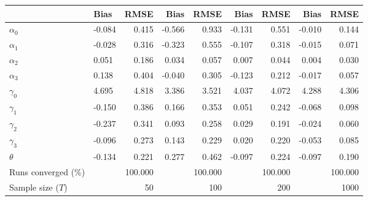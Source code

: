 
\begin{tabular}[t]{llrrrrrrr}
\toprule
  & Bias & RMSE & Bias & RMSE & Bias & RMSE & Bias & RMSE\\
\midrule
$\alpha_{0}$ & -0.084 & 0.415 & -0.566 & 0.933 & -0.131 & 0.551 & -0.010 & 0.144\\
$\alpha_{1}$ & -0.028 & 0.316 & -0.323 & 0.555 & -0.107 & 0.318 & -0.015 & 0.071\\
$\alpha_{2}$ & 0.051 & 0.186 & 0.034 & 0.057 & 0.007 & 0.044 & 0.004 & 0.030\\
$\alpha_{3}$ & 0.138 & 0.404 & -0.040 & 0.305 & -0.123 & 0.212 & -0.017 & 0.057\\
$\gamma_{0}$ & 4.695 & 4.818 & 3.386 & 3.521 & 4.037 & 4.072 & 4.288 & 4.306\\
$\gamma_{1}$ & -0.150 & 0.386 & 0.166 & 0.353 & 0.051 & 0.242 & -0.068 & 0.098\\
$\gamma_{2}$ & -0.237 & 0.341 & 0.093 & 0.258 & 0.029 & 0.191 & -0.024 & 0.060\\
$\gamma_{3}$ & -0.096 & 0.273 & 0.143 & 0.229 & 0.020 & 0.220 & -0.053 & 0.085\\
$\theta$ & -0.134 & 0.221 & 0.277 & 0.462 & -0.097 & 0.224 & -0.097 & 0.190\\
Runs converged (\%) &  & 100.000 &  & 100.000 &  & 100.000 &  & 100.000\\
Sample size ($T$) &  & 50 &  & 100 &  & 200 &  & 1000\\
\bottomrule
\end{tabular}
